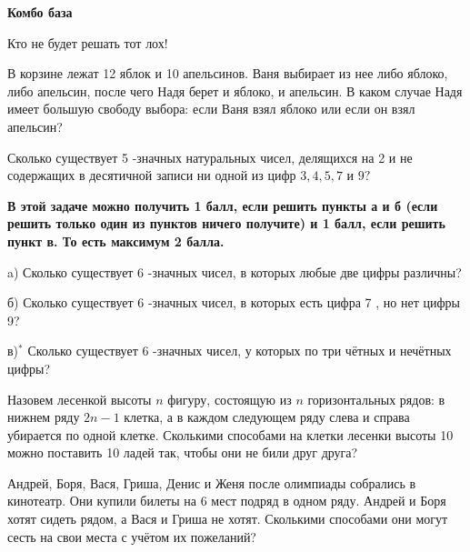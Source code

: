 \centerline{\bf \Huge Комбо база}
\centerline{\bf \Huge }

\begin{flushright}
        \scriptsize{Кто не будет решать тот лох!}
\end{flushright}

В корзине лежат 12 яблок и 10 апельсинов. Ваня выбирает из нее либо яблоко, либо апельсин, после чего Надя берет и яблоко, и апельсин. В каком случае Надя имеет большую свободу выбора: если Ваня взял яблоко или если он взял апельсин?

Сколько существует 5 -значных натуральных чисел, делящихся на 2 и не содержащих в десятичной записи ни одной из цифр $3,4,5,7$ и $9 ?$

 \textbf{В этой задаче можно получить 1 балл, если решить пункты а и б (если решить только один из пунктов ничего получите) и 1 балл, если решить пункт в. То есть максимум 2 балла.}

a) Сколько существует 6 -значных чисел, в которых любые две цифры различны?

б) Сколько существует 6 -значных чисел, в которых есть цифра 7 , но нет цифры 9?

в)$^*$ Сколько существует 6 -значных чисел, у которых по три чётных и нечётных цифры?

Назовем лесенкой высоты $n$ фигуру, состоящую из $n$ горизонтальных рядов: в нижнем ряду $2 n-1$ клетка, а в каждом следующем ряду слева и справа убирается по одной клетке. Сколькими способами на клетки лесенки высоты 10 можно поставить 10 ладей так, чтобы они не били друг друга?

Андрей, Боря, Вася, Гриша, Денис и Женя после олимпиады собрались в кинотеатр. Они купили билеты на 6 мест подряд в одном ряду. Андрей и Боря хотят сидеть рядом, а Вася и Гриша не хотят. Сколькими способами они могут сесть на свои места с учётом их пожеланий?
